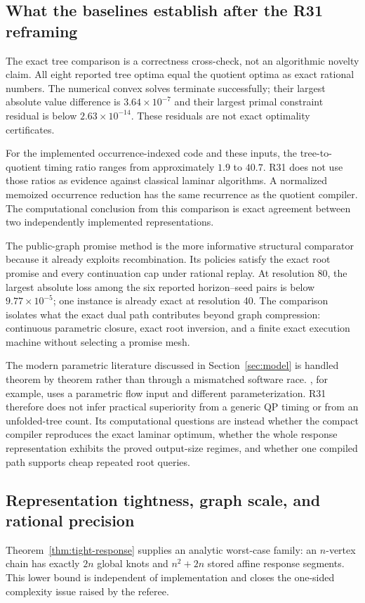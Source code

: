 \subsection{What the baselines establish after the R31 reframing}
The exact tree comparison is a correctness cross-check, not an algorithmic novelty claim. All eight reported tree optima equal the quotient optima as exact rational numbers. The numerical convex solves terminate successfully; their largest absolute value difference is $3.64\times10^{-7}$ and their largest primal constraint residual is below $2.63\times10^{-14}$. These residuals are not exact optimality certificates.

For the implemented occurrence-indexed code and these inputs, the tree-to-quotient timing ratio ranges from approximately $1.9$ to $40.7$. R31 does not use those ratios as evidence against classical laminar algorithms. A normalized memoized occurrence reduction has the same recurrence as the quotient compiler. The computational conclusion from this comparison is exact agreement between two independently implemented representations.

The public-graph promise method is the more informative structural comparator because it already exploits recombination. Its policies satisfy the exact root promise and every continuation cap under rational replay. At resolution 80, the largest absolute loss among the six reported horizon--seed pairs is below $9.77\times10^{-5}$; one instance is already exact at resolution 40. The comparison isolates what the exact dual path contributes beyond graph compression: continuous parametric closure, exact root inversion, and a finite exact execution machine without selecting a promise mesh.

The modern parametric literature discussed in Section~\ref{sec:model} is handled theorem by theorem rather than through a mismatched software race. \citet{KlimmWarode2021}, for example, uses a parametric flow input and different parameterization. R31 therefore does not infer practical superiority from a generic QP timing or from an unfolded-tree count. Its computational questions are instead whether the compact compiler reproduces the exact laminar optimum, whether the whole response representation exhibits the proved output-size regimes, and whether one compiled path supports cheap repeated root queries.

\subsection{Representation tightness, graph scale, and rational precision}
Theorem~\ref{thm:tight-response} supplies an analytic worst-case family: an $n$-vertex chain has exactly $2n$ global knots and $n^2+2n$ stored affine response segments. This lower bound is independent of implementation and closes the one-sided complexity issue raised by the referee.

